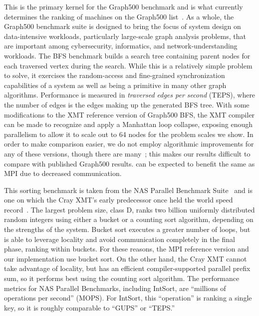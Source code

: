 \vspace{0.5ex}
 This is the primary kernel for the
Graph500 benchmark and is what currently determines the ranking of machines on
the Graph500 list~\cite{graph500list}. As a whole, the Graph500 benchmark
suite is designed to bring the focus of system design on data-intensive
workloads, particularly large-scale graph analysis problems, that are
important among cybersecurity, informatics, and network-understanding
workloads. The BFS benchmark builds a search tree containing parent nodes for
each traversed vertex during the search. While this is a relatively simple
problem to solve, it exercises the random-access and fine-grained
synchronization capabilities of a system as well as being a primitive in many
other graph algorithms. Performance is measured in \emph{traversed edges per
second\/} (TEPS), where the number of edges is the edges making up the
generated BFS tree. With some modifications to the XMT reference version of Graph500 BFS,
the XMT compiler can be made to recognize and apply a Manhattan loop collapse, exposing enough parallelism to allow it to scale out to 64 nodes for the problem scales we show.
In order to make comparison easier, we do not employ algorithmic improvements for any of these versions, though there are
many~\cite{Beamer:Graph500,Yoo:FixedPointGraph500}; this makes our results difficult to compare with published Graph500 results. \Grappa can be expected to benefit the same as MPI due to decreased communication.

\vspace{0.5ex}
 This sorting benchmark is taken from the NAS Parallel Benchmark Suite~\cite{Bailey91thenas,nas3.3} and is one on which the Cray XMT's early predecessor once held the world speed record~\cite{TeraRecord}. The largest problem size, class D, ranks two billion uniformly distributed random integers using either a bucket or a counting sort algorithm, depending on the strengths of the system. Bucket sort executes a greater number of loops, but is able to leverage locality and avoid communication completely in the final phase, ranking within buckets. For these reasons, the MPI reference version and our \Grappa implementation use bucket sort. On the other hand, the Cray XMT cannot take advantage of locality, but has an efficient compiler-supported parallel prefix sum, so it performs best using the counting sort algorithm.  The performance metrics for NAS Parallel Benchmarks, including IntSort, are ``millions of operations per second'' (MOPS). For IntSort, this ``operation'' is ranking a single key, so it is roughly comparable to ``GUPS'' or ``TEPS.''
 
